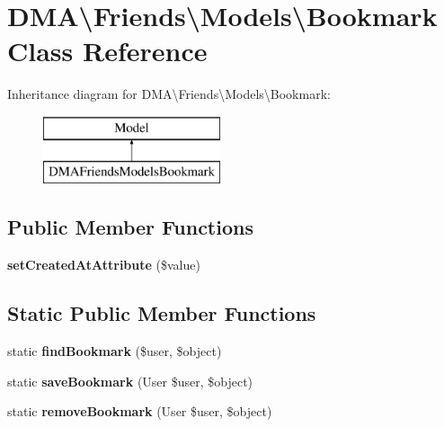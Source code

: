 \hypertarget{classDMA_1_1Friends_1_1Models_1_1Bookmark}{}\section{D\+M\+A\textbackslash{}Friends\textbackslash{}Models\textbackslash{}Bookmark Class Reference}
\label{classDMA_1_1Friends_1_1Models_1_1Bookmark}
Inheritance diagram for D\+M\+A\textbackslash{}Friends\textbackslash{}Models\textbackslash{}Bookmark\+:\begin{figure}[H]
\begin{center}
\leavevmode
\includegraphics[height=2.000000cm]{d9/de4/classDMA_1_1Friends_1_1Models_1_1Bookmark}
\end{center}
\end{figure}
\subsection*{Public Member Functions}
\begin{DoxyCompactItemize}
\item 
\hypertarget{classDMA_1_1Friends_1_1Models_1_1Bookmark_a5afcf6b2bb5788914bec586b3001485d}{}{\bfseries set\+Created\+At\+Attribute} (\$value)\label{classDMA_1_1Friends_1_1Models_1_1Bookmark_a5afcf6b2bb5788914bec586b3001485d}

\end{DoxyCompactItemize}
\subsection*{Static Public Member Functions}
\begin{DoxyCompactItemize}
\item 
\hypertarget{classDMA_1_1Friends_1_1Models_1_1Bookmark_abee78f0ddbe31aec5799062b7e3a8910}{}static {\bfseries find\+Bookmark} (\$user, \$object)\label{classDMA_1_1Friends_1_1Models_1_1Bookmark_abee78f0ddbe31aec5799062b7e3a8910}

\item 
\hypertarget{classDMA_1_1Friends_1_1Models_1_1Bookmark_ab25742747cc7f04c2b068329b0f4b955}{}static {\bfseries save\+Bookmark} (User \$user, \$object)\label{classDMA_1_1Friends_1_1Models_1_1Bookmark_ab25742747cc7f04c2b068329b0f4b955}

\item 
\hypertarget{classDMA_1_1Friends_1_1Models_1_1Bookmark_a13fba3086bee7776d59f6d23a6e68728}{}static {\bfseries remove\+Bookmark} (User \$user, \$object)\label{classDMA_1_1Friends_1_1Models_1_1Bookmark_a13fba3086bee7776d59f6d23a6e68728}

\end{DoxyCompactItemize}
